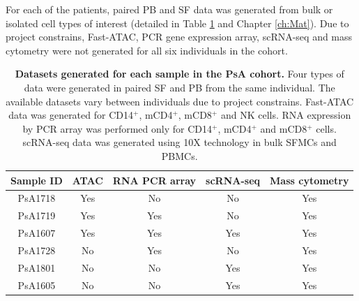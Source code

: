 
For each of the patients, paired PB and SF data was generated from bulk or isolated cell types of interest (detailed in Table \ref{tab:PSA_datasets_per_sample} and Chapter \ref{ch:Mat}). Due to project constrains, Fast-ATAC, PCR gene expression array, scRNA-seq and mass cytometry were not generated for all six individuals in the cohort. 

\begin{table}[htbp]
\centering
\begin{tabular}{@{} c c c c c}
\toprule
\textbf{Sample ID} & \textbf{ATAC} & \textbf{RNA PCR array} & \textbf{scRNA-seq} & \textbf{Mass cytometry} \\
\midrule
\midrule
PsA1718 & Yes & No & No & Yes\\
PsA1719 & Yes & Yes & No & Yes\\
PsA1607 & Yes & Yes & Yes & Yes\\
PsA1728 & No & Yes & No & Yes\\
PsA1801 & No & No & Yes & Yes\\
PsA1605 & No & No & Yes & Yes\\
\bottomrule
\end{tabular}
\medskip %
\caption[Datasets generated for each sample in the PsA cohort.]{\textbf{Datasets generated for each sample in the PsA cohort.} Four types of data were generated in paired SF and PB from the same individual. The available datasets vary between individuals due to project constrains. Fast-ATAC data was generated for CD14$^+$, mCD4$^+$, mCD8$^+$ and NK cells. RNA expression by PCR array was performed only for CD14$^+$, mCD4$^+$ and mCD8$^+$ cells. scRNA-seq data was generated using 10X technology in bulk SFMCs and PBMCs.}
\label{tab:PSA_datasets_per_sample}
\end{table}
\bigskip %

